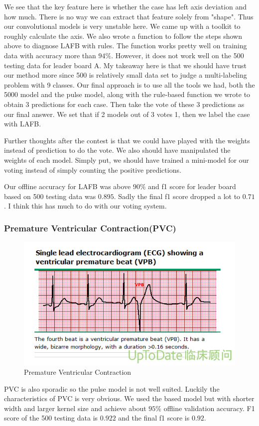 \documentclass[%
 reprint,
 amsmath,amssymb,
 aps,
]{revtex4-2}
\begin{document}
We see that the key feature here is whether the case has left axis deviation and how much. There is no way we can extract that feature solely from "shape". Thus our convolutional models is very unstable here. We came up with a toolkit to roughly calculate the axis. We also wrote a function to follow the steps shown above to diagnose LAFB with rules. The function works pretty well on training data with accuracy more than $94\%$. However, it does not work well on the 500 testing data for leader board A. My takeaway here is that we should have trust our method more since 500 is relatively small data set to judge a multi-labeling problem with 9 classes. Our final approach is to use all the tools we had, both the 5000 model and the pulse model, along with the rule-based function we wrote to obtain 3 predictions for each case. Then take the vote of these 3 predictions as our final answer. We set that if 2 models out of 3 votes 1, then we label the case with LAFB. 

Further thoughts after the contest is that we could have played with the weights instead of prediction to do the vote. We also should have manipulated the weights of each model. Simply put, we should have trained a mini-model for our voting instead of simply counting the positive predictions. 

Our offline accuracy for LAFB was above $90\%$ and f1 score for leader board based on 500 testing data was $0.895$. Sadly the final f1 score dropped a lot to $0.71$. I think this has much to do with our voting system. 

\subsubsection{Premature Ventricular Contraction(PVC)}
\begin{figure}[H]
	\includegraphics[width=\linewidth]{img/PVC.png}
	\caption{\label{fig:PVC} Premature Ventricular Contraction \cite{UptoDate}}
\end{figure}
PVC is also sporadic so the pulse model is not well suited. Luckily the characteristics of PVC is very obvious. We used the based model but with shorter width and larger kernel size and achieve about $95\%$ offline validation accuracy. F1 score of the 500 testing data is $0.922$ and the final f1 score is $0.92$.
\end{document}
